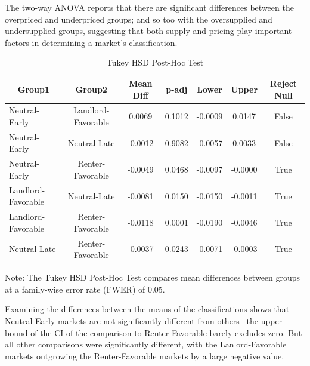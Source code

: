 \documentclass[APA,Times1COL]{WileyNJDv5} %
\begin{document}
The two-way ANOVA reports that there are significant differences between the overpriced and underpriced groups; and so too with the oversupplied and undersupplied groups, suggesting that both supply and pricing play important factors in determining a market's classification.

\begin{table}[ht]
	\centering
	\begin{threeparttable}
		\caption{Tukey HSD Post-Hoc Test\label{tab:tukey}}
		\begin{tabular}{lcccccc}
			\toprule
			\multicolumn{1}{c}{Group1} & Group2             & Mean Diff & p-adj  & Lower  & Upper & Reject Null\\
			\midrule
			Neutral-Early               & Landlord-Favorable  & 0.0069   & 0.1012 & -0.0009 & 0.0147  & False \\
			Neutral-Early               & Neutral-Late         & -0.0012  & 0.9082 & -0.0057 & 0.0033  & False \\
			Neutral-Early              & Renter-Favorable    & -0.0049  & 0.0468 & -0.0097 & -0.0000 & True  \\
			Landlord-Favorable    & Neutral-Late         & -0.0081  & 0.0150 & -0.0150 & -0.0011 & True  \\
			Landlord-Favorable    & Renter-Favorable    & -0.0118  & 0.0001 & -0.0190 & -0.0046 & True  \\
			Neutral-Late           & Renter-Favorable    & -0.0037  & 0.0243 & -0.0071 & -0.0003 & True  \\
			\bottomrule
		\end{tabular}
		\begin{tablenotes}
			\footnotesize
			\item Note: The Tukey HSD Post-Hoc Test compares mean differences between groups at a family-wise error rate (FWER) of 0.05. 
		\end{tablenotes}
	\end{threeparttable}
\end{table}

Examining the differences between the means of the classifications shows that Neutral-Early markets are not significantly different from others-- the upper bound of the CI of the comparison to Renter-Favorable barely excludes zero. But all other comparisons were significantly different, with the Lanlord-Favorable markets outgrowing the Renter-Favorable markets by a large negative value.
\end{document}
